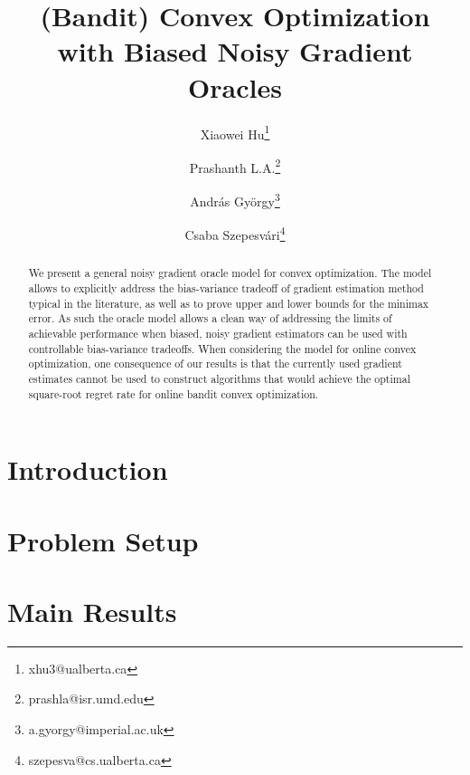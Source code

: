 \documentclass[11pt,letterpaper,english]{article}
\begin{document}
\title{(Bandit) Convex Optimization with Biased Noisy Gradient Oracles}
\author[1]{Xiaowei  Hu\thanks{xhu3@ualberta.ca}}
\author[2]{Prashanth L.A.\thanks{prashla@isr.umd.edu}}
\author[3]{Andr\'as Gy\"orgy\thanks{a.gyorgy@imperial.ac.uk}}
\author[4]{Csaba Szepesv\'ari\thanks{szepesva@cs.ualberta.ca}}


\renewcommand\Authands{ and }

\date{}

\maketitle

\begin{abstract}
We present a general noisy gradient oracle model for convex optimization. The model allows to explicitly address the bias-variance tradeoff of gradient estimation method typical in the literature, as well as to prove upper and lower bounds for the minimax error. As such the oracle model allows a clean way of addressing the limits of achievable performance
when biased, noisy gradient estimators can be used with controllable bias-variance tradeoffs.
When considering the model for online convex optimization,
one consequence of our results is that the currently used gradient estimates cannot be used to construct
algorithms that would achieve the optimal square-root regret rate for online bandit convex optimization.
\end{abstract}

\section{Introduction}
\label{sec:intro}


\section{Problem Setup}
\label{sec:problem}


\section{Main Results}
\label{sec:results}

\end{document}
